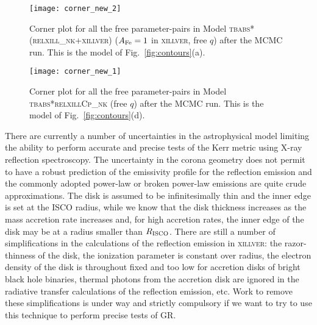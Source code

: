 \documentclass[11pt,a4paper,pdftex]{article}
\begin{document}
	
	
\begin{figure*}
\begin{center}
\texttt{[image: corner\_new\_2]}
\end{center}
\vspace{-0.4cm}
\caption{Corner plot for all the free parameter-pairs in Model \textsc{tbabs*(relxill\_nk+xillver)} ($A_{\rm Fe}=1$ in \textsc{xillver}, free $q$) after the MCMC run. This is the model of Fig.~\ref{fig:contours}(a). \label{fig:corner_new_2}}
\end{figure*}


\begin{figure*}
\begin{center}
\texttt{[image: corner\_new\_1]}
\end{center}
\vspace{-0.4cm}
\caption{Corner plot for all the free parameter-pairs in Model \textsc{tbabs*relxillCp\_nk} (free $q$) after the MCMC run. This is the model of Fig.~\ref{fig:contours}(d). \label{fig:corner_new_1}}
\end{figure*}	
	
	

	

There are currently a number of uncertainties in the astrophysical model limiting the ability to perform accurate and precise tests of the Kerr metric using X-ray reflection spectroscopy. The uncertainty in the corona geometry does not permit to have a robust prediction of the emissivity profile for the reflection emission and the commonly adopted power-law or broken power-law emissions are quite crude approximations. The disk is assumed to be infinitesimally thin and the inner edge is set at the ISCO radius, while we know that the disk thickness increases as the mass accretion rate increases and, for high accretion rates, the inner edge of the disk may be at a radius smaller than $R_{\rm ISCO}$. There are still a number of simplifications in the calculations of the reflection emission in \textsc{xillver}: the razor-thinness of the disk, the ionization parameter is constant over radius, the electron density of the disk is throughout fixed and too low for accretion disks of bright black hole binaries, thermal photons from the accretion disk are ignored in the radiative transfer calculations of the reflection emission, etc. Work to remove these simplifications is under way and strictly compulsory if we want to try to use this technique to perform precise tests of GR.
\end{document}
